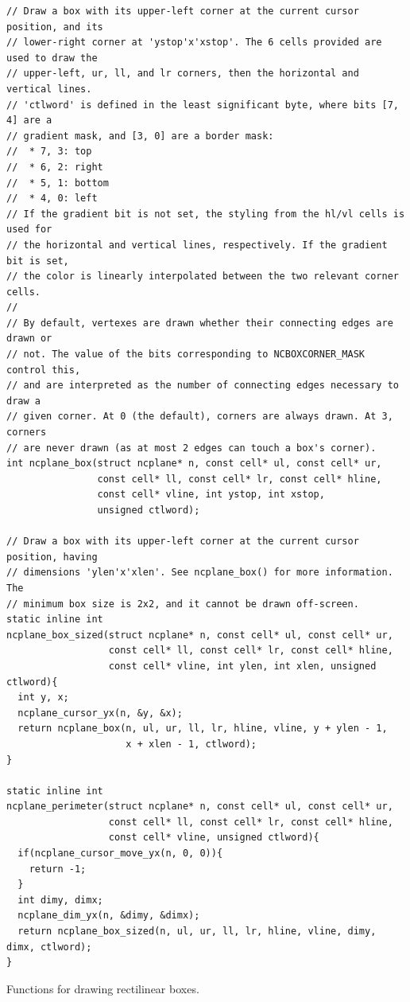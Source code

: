 \documentclass[letterpaper,10pt]{article}
\begin{document}
\begin{listing}[!htbp]
\begin{verbatim}
// Draw a box with its upper-left corner at the current cursor position, and its
// lower-right corner at 'ystop'x'xstop'. The 6 cells provided are used to draw the
// upper-left, ur, ll, and lr corners, then the horizontal and vertical lines.
// 'ctlword' is defined in the least significant byte, where bits [7, 4] are a
// gradient mask, and [3, 0] are a border mask:
//  * 7, 3: top
//  * 6, 2: right
//  * 5, 1: bottom
//  * 4, 0: left
// If the gradient bit is not set, the styling from the hl/vl cells is used for
// the horizontal and vertical lines, respectively. If the gradient bit is set,
// the color is linearly interpolated between the two relevant corner cells.
//
// By default, vertexes are drawn whether their connecting edges are drawn or
// not. The value of the bits corresponding to NCBOXCORNER_MASK control this,
// and are interpreted as the number of connecting edges necessary to draw a
// given corner. At 0 (the default), corners are always drawn. At 3, corners
// are never drawn (as at most 2 edges can touch a box's corner).
int ncplane_box(struct ncplane* n, const cell* ul, const cell* ur,
                const cell* ll, const cell* lr, const cell* hline,
                const cell* vline, int ystop, int xstop,
                unsigned ctlword);

// Draw a box with its upper-left corner at the current cursor position, having
// dimensions 'ylen'x'xlen'. See ncplane_box() for more information. The
// minimum box size is 2x2, and it cannot be drawn off-screen.
static inline int
ncplane_box_sized(struct ncplane* n, const cell* ul, const cell* ur,
                  const cell* ll, const cell* lr, const cell* hline,
                  const cell* vline, int ylen, int xlen, unsigned ctlword){
  int y, x;
  ncplane_cursor_yx(n, &y, &x);
  return ncplane_box(n, ul, ur, ll, lr, hline, vline, y + ylen - 1,
                     x + xlen - 1, ctlword);
}

static inline int
ncplane_perimeter(struct ncplane* n, const cell* ul, const cell* ur,
                  const cell* ll, const cell* lr, const cell* hline,
                  const cell* vline, unsigned ctlword){
  if(ncplane_cursor_move_yx(n, 0, 0)){
    return -1;
  }
  int dimy, dimx;
  ncplane_dim_yx(n, &dimy, &dimx);
  return ncplane_box_sized(n, ul, ur, ll, lr, hline, vline, dimy, dimx, ctlword);
}
\end{verbatim}
\caption{Functions for drawing rectilinear boxes.}
\label{list:boxes}
\end{listing}
\end{document}
